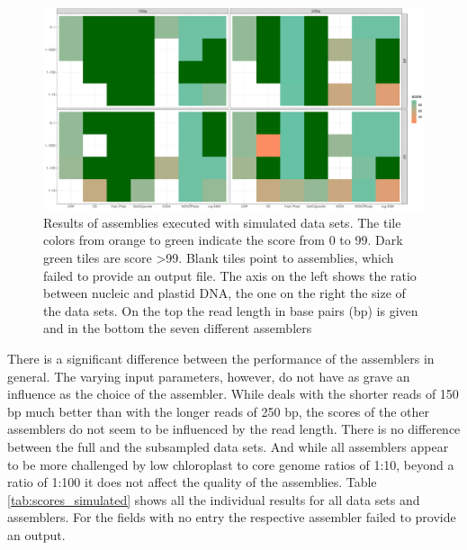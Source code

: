 \begin{figure}[H]
\centering
\includegraphics[height=.55\textheight, width=.99\textwidth]{Figures/sim_tiles}
\decoRule
\caption[Score of assemblies of simulated data sets]{Results of assemblies executed with
  simulated data sets. The tile colors from orange to green indicate the score from 0 to
  99. Dark green tiles are score >99. Blank tiles point to assemblies, which failed to
  provide an output file. The axis on the left shows the ratio between nucleic and
  plastid DNA, the one on the right the size of the data sets. On the top the read length
  in base pairs (bp) is given and in the bottom the seven different assemblers}
\label{fig:sim_tiles}
\end{figure}

There is a significant difference between the performance of the assemblers in general.
The varying input parameters, however, do not have as grave an influence as the choice of
the assembler. While \fp \hspace{0.25ex} deals with the shorter reads of 150 bp much better
than with the longer reads of 250 bp, the scores of the other assemblers do not seem to be
influenced by the read length. There is no difference between the full and the subsampled
data sets. And while all assemblers appear to be more challenged by low chloroplast to
core genome ratios of 1:10, beyond a ratio of 1:100 it does not affect the quality of the
assemblies. Table \ref{tab:scores_simulated} shows all the individual results for all data
sets and assemblers. For the fields with no entry the respective assembler failed to
provide an output.

